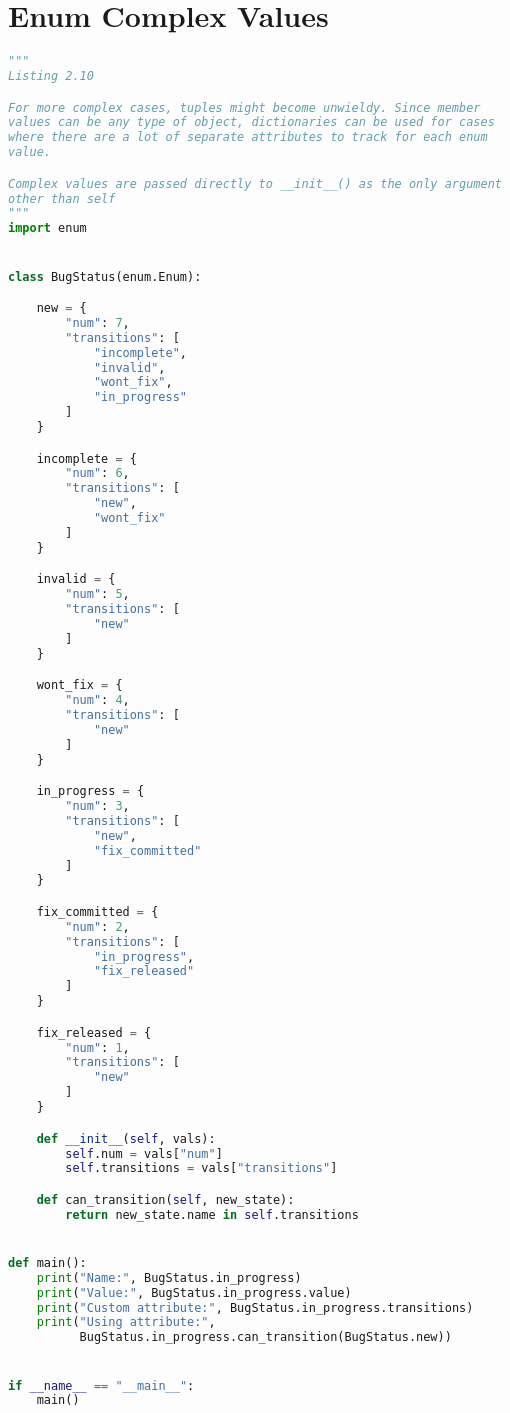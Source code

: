 \documentclass[a4paper,landscape]{report}
\begin{document}
\section{Enum Complex Values}
\begin{lstlisting}[language=Python]
"""
Listing 2.10

For more complex cases, tuples might become unwieldy. Since member
values can be any type of object, dictionaries can be used for cases
where there are a lot of separate attributes to track for each enum
value.

Complex values are passed directly to __init__() as the only argument
other than self
"""
import enum


class BugStatus(enum.Enum):

    new = {
        "num": 7,
        "transitions": [
            "incomplete",
            "invalid",
            "wont_fix",
            "in_progress"
        ]
    }

    incomplete = {
        "num": 6,
        "transitions": [
            "new",
            "wont_fix"
        ]
    }

    invalid = {
        "num": 5,
        "transitions": [
            "new"
        ]
    }

    wont_fix = {
        "num": 4,
        "transitions": [
            "new"
        ]
    }

    in_progress = {
        "num": 3,
        "transitions": [
            "new",
            "fix_committed"
        ]
    }

    fix_committed = {
        "num": 2,
        "transitions": [
            "in_progress",
            "fix_released"
        ]
    }

    fix_released = {
        "num": 1,
        "transitions": [
            "new"
        ]
    }

    def __init__(self, vals):
        self.num = vals["num"]
        self.transitions = vals["transitions"]

    def can_transition(self, new_state):
        return new_state.name in self.transitions


def main():
    print("Name:", BugStatus.in_progress)
    print("Value:", BugStatus.in_progress.value)
    print("Custom attribute:", BugStatus.in_progress.transitions)
    print("Using attribute:",
          BugStatus.in_progress.can_transition(BugStatus.new))


if __name__ == "__main__":
    main()

\end{lstlisting}
\end{document}
